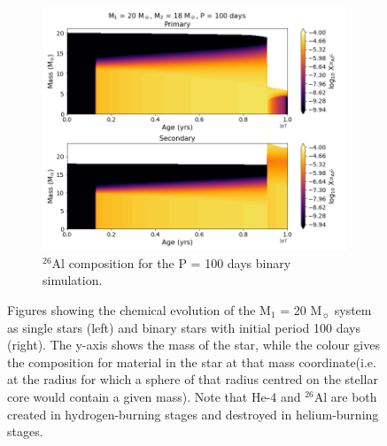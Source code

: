 \begin{figure}
    \begin{subfigure}{\columnwidth}
        \includegraphics[width=\textwidth]{figures/results1/fig_Al26_Age_M20_P100.png}
        \captionsetup{width=.9\columnwidth}
        \caption{$^{26}$Al composition for the P = 100 days binary simulation.}
        \label{subfig:20Msol_Al26_Bin}
    \end{subfigure}
\caption{Figures showing the chemical evolution of the M$_1$ = 20 M$_{\sun}$ system as single stars (left) and binary stars with initial period 100 days (right).
The y-axis shows the mass of the star, while the colour gives the composition for material in the star at that mass coordinate(i.e. at the radius for which a sphere of that radius centred on the stellar core would contain a given mass).
Note that He-4 and $^{26}$Al are both created in hydrogen-burning stages and destroyed in helium-burning stages.
}
\label{fig:20Msol_Composition}
\end{figure}

